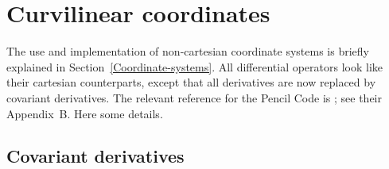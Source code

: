 \documentclass[\mydriver,12pt,twoside,notitlepage,a4paper]{article}
\begin{document}

\section{Curvilinear coordinates}
\label{Curvilinear-coordinates}

The use and implementation of non-cartesian coordinate systems
is briefly explained in Section~\ref{Coordinate-systems}.
All differential operators look like their cartesian counterparts,
except that all derivatives are now replaced by covariant derivatives.
The relevant reference for the {\sc Pencil Code} is \cite{MTBM09};
see their Appendix~B.
Here some details.

\subsection{Covariant derivatives}
\label{Covariant-derivatives}
\end{document}
